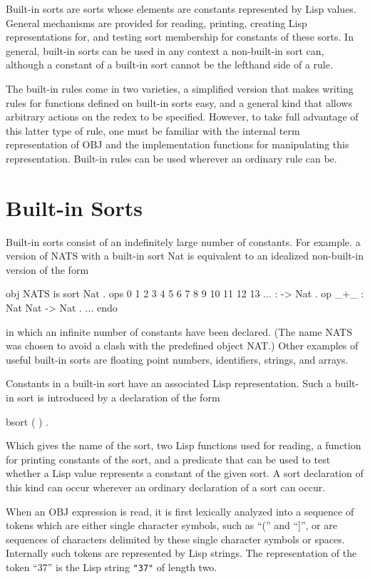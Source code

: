 Built-in sorts are sorts whose elements are constants represented by
Lisp values.  General mechanisms are provided for reading, printing,
creating Lisp representations for, and testing sort membership for
constants of these sorts.  In general, built-in sorts can be used in
any context a non-built-in sort can, although a constant of a built-in
sort cannot be the lefthand side of a rule.

The built-in rules come in two varieties, a simplified version that
makes writing rules for functions defined on built-in sorts easy, and
a general kind that allows arbitrary actions on the redex to be
specified.  However, to take full advantage of this latter type of
rule, one must be familiar with the internal term representation of
OBJ and the implementation functions for manipulating this
representation.  Built-in rules can be used wherever an ordinary rule
can be.

\section{Built-in Sorts}

Built-in sorts consist of an indefinitely large number of constants.
For example. a version of NATS with a built-in sort Nat is equivalent
to an idealized non-built-in version of the form

\bobj
obj NATS is
  sort Nat .
  ops 0 1 2 3 4 5 6 7 8 9 10 11 12 13 ... : -> Nat .
  op _+_ : Nat Nat -> Nat .
  ...
endo
\eobj

\noindent in which an infinite number of constants have been declared.
(The name NATS was chosen to avoid a clash with the predefined
object NAT.)
Other examples of useful built-in sorts are
floating point numbers, identifiers, strings, and arrays.

Constants in a built-in sort have an associated Lisp representation.
Such a built-in sort is introduced by a declaration of the form

\bobj
bsort  (   ) .
\eobj

\noi Which gives the name of the sort, two Lisp functions used for
reading, a function for printing constants of the sort, and a
predicate that can be used to test whether a Lisp value represents a
constant of the given sort.  A sort declaration of this kind can occur
wherever an ordinary declaration of a sort can occur.

When an OBJ expression is read, it is first lexically analyzed into a
sequence of tokens which are either single character symbols, such as
``('' and ``]'', or are sequences of characters delimited by these
single character symbols or spaces.  Internally such tokens are
represented by Lisp strings.  The representation of the token ``37''
is the Lisp string {\tt "37"} of length two.

